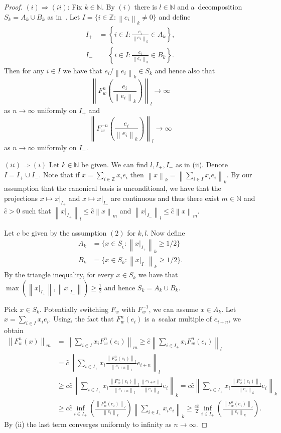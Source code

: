 \documentclass[11pt,a4paper]{amsart}
\theoremstyle{definition}
\newcommand{\Z}{\mathbb{Z}}
\newcommand{\N}{\mathbb{N}}
\newcommand{\norm}[1]{\left\| #1 \right\|}
\begin{document}
	\begin{proof}
		\((i) \Longrightarrow (ii)\): Fix \(k \in \N\). By \((i)\) there is \(l \in \N\) and a~decomposition \(S_k = A_k \cup B_k\) as in~. Let \(I = \{i \in \Z : \norm{e_i}_k \neq 0 \}\) and define
		\begin{align*}
			I_+ &= \left\{i \in I : \frac{e_i}{\norm{e_i}_k} \in A_k \right\}, \\
			I_- &= \left\{i \in I : \frac{e_i}{\norm{e_i}_k} \in B_k \right\}.
		\end{align*}
		Then for any \(i \in I\) we have that \(e_i/\norm{e_i}_k \in S_k\) and hence also that
		\[\norm{F^n_w\left(\frac{e_i}{\norm{e_i}_k}\right)}_l \to \infty\]
		as \(n \to \infty\) uniformly on \(I_+\) and
		\[\norm{F^{-n}_w\left(\frac{e_i}{\norm{e_i}_k}\right)}_l \to \infty\]
		as \(n \to \infty\) uniformly on \(I_-\).
		
		
		\((ii) \Longrightarrow (i)\) Let \(k \in \N\) be given. We can find $l, I_+, I_-$ as in (ii). Denote \(I = I_{+} \cup I_{-}\). Note that if \(x = \sum_{i \in \Z}x_i e_i\) then \(\norm{x}_k = \norm{\sum_{i\in I} x_i e_i}_k\). By our assumption that the canonical basis is unconditional, we have that the projections \(x \mapsto x |_{I_+}\) and \(x \mapsto x |_{I_-}\) are continuous and thus there exist \(m \in \N\) and \(\hat{c} > 0\) such that \(\norm{x |_{I_+}}_l \leq \hat{c} \norm{x}_m\) and \(\norm{x |_{I_-}}_l \leq \hat{c} \norm{x}_m\).
		
		Let \(c\) be given by the assumption \((2)\) for \(k,l\). Now define
		\begin{align*}
			A_k &= \{x \in S_{_k} : \norm{x |_{I_+}}_k \geq 1/2\}\\
			B_k &= \{x \in S_{k} : \norm{x |_{I_-}}_k \geq 1/2\}.
		\end{align*}
		By the triangle inequality, for every \(x \in S_{k}\) we have that \(\max{(\norm{x |_{I_+}},\norm{x |_{I_-}})} \geq \frac{1}{2}\) and hence $S_k = A_k \cup B_k$.
		
		Pick \(x \in S_{k}\). Potentially switching $F_w$ with $F_w^{-1}$, we can assume \(x \in A_k\).
		Let \(x = \sum_{i\in I} x_i e_i\). Using, the fact that $F_w^n(e_i)$ is a~scalar multiple of $e_{i+n}$, we obtain
		\begin{align*}
			\norm{F_w^n (x) }_m
			&= \norm{\sum_{i\in I} x_i F_w^n(e_i)}_m
			\geq \hat{c} \norm{\sum_{i \in I_+} x_i F_w^n(e_i)}_l \\
			&= \hat{c}\norm{\sum_{i \in I_+} x_i \frac{\norm{F_w^n(e_i)}_l}{\norm{e_{i+n}}_l}e_{i+n}}_l \\
			&\geq c \hat{c} \norm{\sum_{i \in I_+} x_i \frac{\norm{F_w^n(e_i)}_l}{\norm{e_{i+n}}_l}\frac{\norm{e_{i+n}}_l}{\norm{e_i}_k} e_i}_k
			= c \hat{c}\norm{\sum_{i \in I_+} x_i \frac{\norm{F_w^n(e_i)}_l}{\norm{e_{i}}_k}e_i}_k \\
			&\geq c \hat{c} \inf_{i \in I_+}\left(\frac{\norm{F^n_w(e_i)}_l}{\norm{e_i}_k}\right) \norm{\sum_{i \in I_+} x_i e_i}_k
			\geq \frac{c \hat{c}}{2} \inf_{i \in I_+}\left(\frac{\norm{F^n_w(e_i)}_l}{\norm{e_i}_k}\right).
		\end{align*}
		By (ii) the last term converges uniformly to infinity as \(n \to \infty\).
	\end{proof}
	
\end{document}
